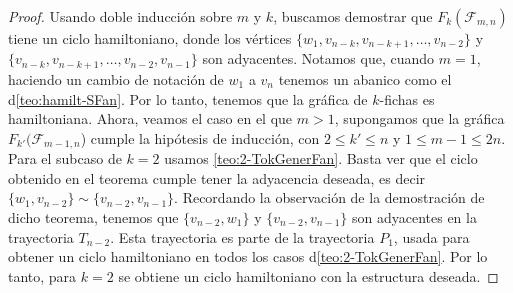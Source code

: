 \begin{proof}
    Usando doble inducci\'on sobre $m$ y $k$, buscamos demostrar que
    $F_k(\mathcal{F}_{m,n})$ tiene un ciclo hamiltoniano, donde los v\'ertices
    $\{w_1, v_{n-k}, v_{n-k+1}, \dots, v_{n-2}\}$ y $\{v_{n-k}, v_{n-k+1},
    \dots, v_{n-2}, v_{n-1}\}$ son adyacentes. Notamos que, cuando $m =1$,
    haciendo un cambio de notaci\'on de $w_1$ a $v_n$ tenemos un abanico como el
    d\cref{teo:hamilt-SFan}. Por lo tanto, tenemos que la gr\'afica de
    $k$-fichas es hamiltoniana. Ahora, veamos el caso en el que $m>1$,
    supongamos que la gr\'afica $F_{k'}(\mathcal{F}_{m-1,n}$) cumple la
    hip\'otesis de inducci\'on, con $2\leq k'\leq n$ y $1 \leq m-1 \leq 2n$.
    Para el subcaso de $k=2$ usamos \cref{teo:2-TokGenerFan}. Basta ver que el
    ciclo obtenido en el teorema cumple tener la adyacencia deseada, es decir
    $\{w_1, v_{n-2}\}\sim\{v_{n-2}, v_{n-1}\}$. Recordando la observaci\'on de
    la demostraci\'on de dicho teorema, tenemos que $\{v_{n-2},w_1\}$ y
    $\{v_{n-2},v_{n-1}\}$ son adyacentes en la trayectoria $T_{n-2}$. Esta
    trayectoria es parte de la trayectoria $P_1$, usada para obtener un ciclo
    hamiltoniano en todos los casos d\cref{teo:2-TokGenerFan}. Por lo tanto,
    para $k=2$ se obtiene un ciclo hamiltoniano con la estructura deseada.


\end{proof}

